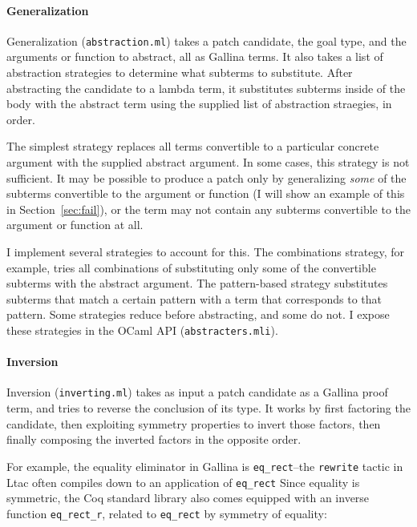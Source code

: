 \paragraph{Generalization} Generalization (\lstinline{abstraction.ml}) %
takes a patch candidate, the goal type, and the arguments or function to abstract,
all as Gallina terms.
It also takes a list of abstraction strategies to determine what subterms to substitute.
After abstracting the candidate to a lambda term, it substitutes subterms inside of the body with the abstract term
using the supplied list of abstraction straegies, in order.

The simplest strategy replaces all terms convertible to a particular concrete argument %
with the supplied abstract argument.
In some cases, this strategy is not sufficient.
It may be possible to produce a patch only by generalizing \emph{some} of the subterms
convertible to the argument or function (I will show an example of this in Section~\ref{sec:fail}),
or the term may not contain any subterms convertible to the argument or function at all.

I implement several strategies to account for this. The combinations strategy, for example,
tries all combinations of substituting only some of the convertible subterms with the abstract argument. 
The pattern-based strategy substitutes subterms that match a certain pattern
with a term that corresponds to that pattern.
Some strategies reduce before abstracting, and some do not.
I expose these strategies in the \sysname OCaml API (\lstinline{abstracters.mli}). %

\paragraph{Inversion} Inversion (\lstinline{inverting.ml}) takes as input a patch candidate as a Gallina proof term,
and tries to reverse the conclusion of its type.
It works by first factoring the candidate,
then exploiting symmetry properties to invert those factors,
then finally composing the inverted factors in the opposite order.

For example, the equality eliminator in Gallina is \lstinline{eq_rect}--the \lstinline{rewrite} tactic in Ltac
often compiles down to an application of \lstinline{eq_rect} %
Since equality is symmetric, the Coq standard library also comes equipped with an inverse function \lstinline{eq_rect_r},
related to \lstinline{eq_rect} by symmetry of equality:


